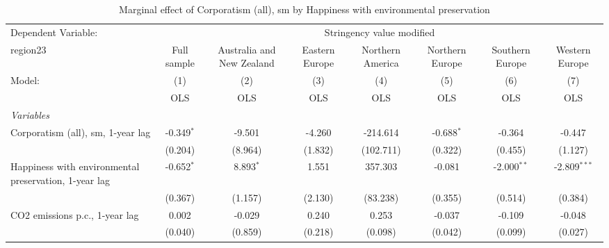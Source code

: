 
\begin{table}[htbp]
   \caption{Marginal effect of Corporatism (all), sm by Happiness with environmental preservation}
   \centering
   \begin{tabular}{lccccccc}
      \toprule
      Dependent Variable: & \multicolumn{7}{c}{Stringency value modified}\\
      region23                                                                                  & Full sample   & Australia and New Zealand & Eastern Europe & Northern America & Northern Europe & Southern Europe & Western Europe \\   
      Model:                                                                                    & (1)           & (2)                       & (3)            & (4)              & (5)             & (6)             & (7)\\  
                                                                                                &  OLS          & OLS                       & OLS            & OLS              & OLS             & OLS             & OLS\\  
      \midrule
      \emph{Variables}\\
      Corporatism (all), sm, 1-year lag                                                         & -0.349$^{*}$  & -9.501                    & -4.260         & -214.614         & -0.688$^{*}$    & -0.364          & -0.447\\   
                                                                                                & (0.204)       & (8.964)                   & (1.832)        & (102.711)        & (0.322)         & (0.455)         & (1.127)\\   
      Happiness with environmental preservation, 1-year lag                                     & -0.652$^{*}$  & 8.893$^{*}$               & 1.551          & 357.303          & -0.081          & -2.000$^{**}$   & -2.809$^{***}$\\   
                                                                                                & (0.367)       & (1.157)                   & (2.130)        & (83.238)         & (0.355)         & (0.514)         & (0.384)\\   
      CO2 emissions p.c., 1-year lag                                                            & 0.002         & -0.029                    & 0.240          & 0.253            & -0.037          & -0.109          & -0.048\\   
                                                                                                & (0.040)       & (0.859)                   & (0.218)        & (0.098)          & (0.042)         & (0.099)         & (0.027)\\   

\end{tabular}
\end{table}

